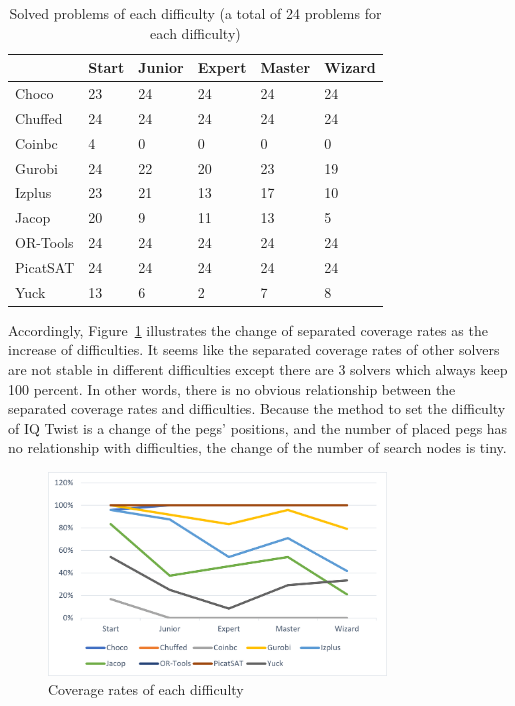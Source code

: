 \begin{table}[htbp]
\centering
\caption{Solved problems of each difficulty (a total of 24 problems for each difficulty)}
\label{tab:solvedproblemforeach difficulty}
\begin{tabular}{|l|l|l|l|l|l|}
\hline
	    &Start&	Junior&	Expert&	Master&	Wizard\\
\hline
Choco   &23   &24 &24 &24 &24\\
\hline
Chuffed	&24   &24 &24 &24 &24\\
\hline
Coinbc	&4    &0  &0  &	0 &0\\
\hline
Gurobi	&24   &22 &20 &	23&19\\
\hline
Izplus	&23   &21 &13 &	17&10\\
\hline
Jacop	&20   &9  &11 &13 &5\\
\hline
OR-Tools	&24   &24 &24 &	24&24\\
\hline
PicatSAT&24   &24 &24 &24 &24\\
\hline
Yuck    &13	  &6  &2  &7  &8\\
\hline
\end{tabular}
\end{table}
Accordingly, Figure~\ref{fig:comparisonIQtwist} illustrates the change of separated coverage rates as the increase of difficulties. It seems like the separated coverage rates of other solvers are not stable in different difficulties except there are 3 solvers which always keep 100 percent. In other words, there is no obvious relationship between the separated coverage rates and difficulties. Because the method to set the difficulty of IQ Twist is a change of the pegs' positions, and the number of placed pegs has no relationship with difficulties, the change of the number of search nodes is tiny. 
\begin{figure}[H]
    \centering
    \includegraphics[width=0.8\textwidth]{figs/separated coverage.png}
    \caption{Coverage rates of each difficulty}
    \label{fig:comparisonIQtwist}
\end{figure}
